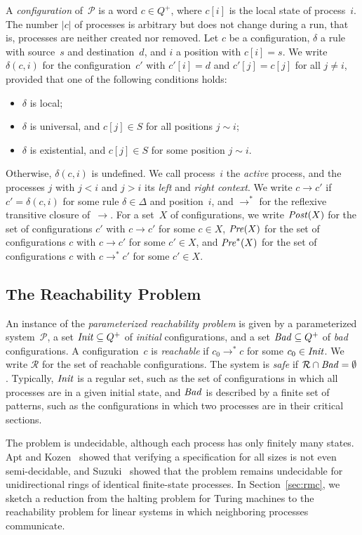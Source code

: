 A \emph{configuration} of~$\mathcal{P}$ is a word $c \in Q^+$, where $c[i]$ is
the local state of process~$i$. The number $|c|$ of processes is arbitrary but
does not change during a run, that is, processes are neither created nor
removed. Let $c$ be a configuration, $\delta$ a rule with
source~$s$ and destination~$d$, and $i$ a position with $c[i] = s$. We write
$\delta(c,i)$ for the configuration~$c'$ with $c'[i] = d$ and $c'[j] = c[j]$
for all $j \neq i$, provided that one of the following conditions holds:
\begin{itemize}[nosep]
\item $\delta$ is local;
\item $\delta$ is universal, and $c[j] \in S$ for all positions $j \sim i$;
\item $\delta$ is existential, and $c[j] \in S$ for some position $j \sim i$.
\end{itemize}
Otherwise, $\delta(c,i)$ is undefined. We call process~$i$ the \emph{active}
process, and the processes $j$ with $j < i$ and $j > i$ its \emph{left} and
\emph{right context}. We write $c \to c'$ if $c' = \delta(c,i)$ for some rule
$\delta \in \Delta$ and position~$i$, and $\to^*$ for the reflexive transitive
closure of~$\to$. For a set~$X$ of configurations, we write $\mathit{Post}(X)$ for the
set of configurations $c'$ with $c \to c'$ for some $c \in X$, $\mathit{Pre}(X)$ for
the set of configurations $c$ with $c \to c'$ for some $c' \in X$, and
$\mathit{Pre}^*(X)$ for the set of configurations $c$ with $c \to^* c'$ for some $c' \in
X$.

\subsection{The Reachability Problem}

An instance of the \emph{parameterized reachability problem} is given by a
parameterized system~$\mathcal{P}$, a set $\mathit{Init} \subseteq Q^+$ of
\emph{initial} configurations, and a set $\mathit{Bad} \subseteq Q^+$ of \emph{bad}
configurations. A configuration~$c$ is \emph{reachable} if $c_0 \to^* c$ for
some $c_0 \in \mathit{Init}$. We write $\mathcal{R}$ for the set of reachable
configurations. The system is \emph{safe} if $\mathcal{R} \cap \mathit{Bad} =
\emptyset$. Typically, $\mathit{Init}$ is a regular set, such as the set of
configurations in which all processes are in a given initial state, and
$\mathit{Bad}$ is described by a finite set of patterns, such as the configurations in
which two processes are in their critical sections.

The problem is undecidable, although each process has only finitely many
states. Apt and
Kozen~\cite{AK86} showed that verifying a specification for all sizes is not
even semi-decidable, and Suzuki~\cite{Suz88} showed that the problem remains
undecidable for unidirectional rings of identical finite-state processes. In
Section~\ref{sec:rmc}, we sketch a reduction from the halting problem for
Turing machines to the reachability problem for linear systems in which
neighboring processes communicate.
